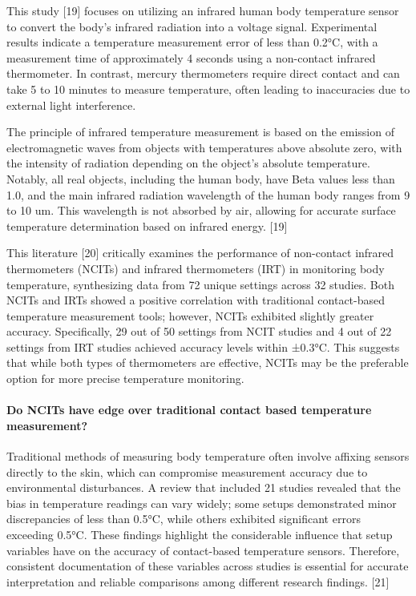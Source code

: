 \documentclass{article}
\begin{document}
This study {[}19{]} focuses on utilizing an infrared human body
temperature sensor to convert the body's infrared radiation into a
voltage signal. Experimental results indicate a temperature measurement
error of less than 0.2°C, with a measurement time of approximately 4
seconds using a non-contact infrared thermometer. In contrast, mercury
thermometers require direct contact and can take 5 to 10 minutes to
measure temperature, often leading to inaccuracies due to external light
interference.

The principle of infrared temperature measurement is based on the
emission of electromagnetic waves from objects with temperatures above
absolute zero, with the intensity of radiation depending on the object's
absolute temperature. Notably, all real objects, including the human
body, have Beta values less than 1.0, and the main infrared radiation
wavelength of the human body ranges from 9 to 10 um. This wavelength is
not absorbed by air, allowing for accurate surface temperature
determination based on infrared energy. {[}19{]}

This literature {[}20{]} critically examines the performance of
non-contact infrared thermometers (NCITs) and infrared thermometers
(IRT) in monitoring body temperature, synthesizing data from 72 unique
settings across 32 studies. Both NCITs and IRTs showed a positive
correlation with traditional contact-based temperature measurement
tools; however, NCITs exhibited slightly greater accuracy. Specifically,
29 out of 50 settings from NCIT studies and 4 out of 22 settings from
IRT studies achieved accuracy levels within ±0.3°C. This suggests that
while both types of thermometers are effective, NCITs may be the
preferable option for more precise temperature monitoring.

\paragraph{Do NCITs have edge over traditional contact based temperature
measurement?}\label{do-ncits-have-edge-over-traditional-contact-based-temperature-measurement}

Traditional methods of measuring body temperature often involve affixing
sensors directly to the skin, which can compromise measurement accuracy
due to environmental disturbances. A review that included 21 studies
revealed that the bias in temperature readings can vary widely; some
setups demonstrated minor discrepancies of less than 0.5°C, while others
exhibited significant errors exceeding 0.5°C. These findings highlight
the considerable influence that setup variables have on the accuracy of
contact-based temperature sensors. Therefore, consistent documentation
of these variables across studies is essential for accurate
interpretation and reliable comparisons among different research
findings. {[}21{]}
\end{document}
